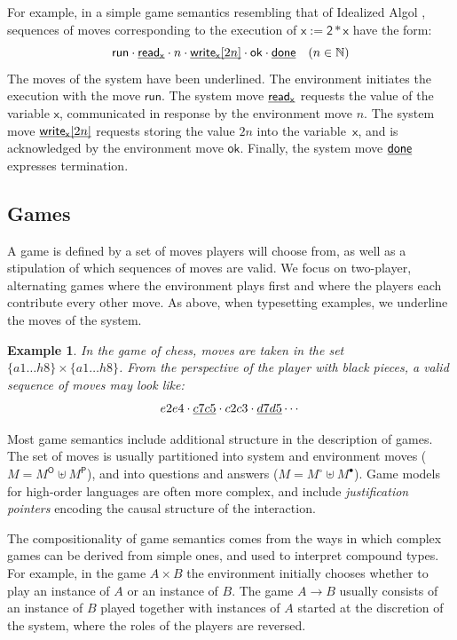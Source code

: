\documentclass[11pt,oneside,draft]{book}
\newtheorem{example}[theorem]{Example}
\theoremstyle{definition}
\newcommand{\kw}[1]{\ensuremath{ \mathsf{#1} }}
\newcommand{\que}{\circ}         %
\newcommand{\ans}{\bullet}       %
\newcommand{\ul}[1]{%
  \underline{\smash{#1}}
}
\begin{document}
For example,
in a simple game semantics resembling that of
Idealized Algol \citep{gsia},
sequences of moves corresponding to
the execution of $\kw{x := 2 * x}$
have the form:
\[
    \kw{run} \cdot
    \ul{\kw{read}_\kw{x}} \cdot n \cdot
    \ul{\kw{write}_\kw{x}[2n]} \cdot \kw{ok} \cdot
    \ul{\kw{done}} \quad (n \in \mathbb{N})
\]
The moves of the system have been underlined.
The environment initiates the execution with
the move $\kw{run}$.
The system move $\ul{\kw{read}_\kw{x}}$ requests
the value of the variable $\kw{x}$,
communicated in response by the environment move $n$.
The system move $\ul{\kw{write}_\kw{x}[2n]}$ requests
storing the value $2n$ into the variable~$\kw{x}$,
and is acknowledged by the environment move $\kw{ok}$.
Finally, the system move $\ul{\kw{done}}$
expresses termination.


\subsection{Games} \label{sec:mainideas:gs:games} %

A game is defined by a set of moves
players will choose from,
as well as a stipulation of which
sequences of moves are valid.
We focus on two-player, alternating games
where the environment plays first and
where the players
each contribute every other move.
As above, when typesetting examples,
we underline the moves of the system.

\begin{example}
In the game of chess,
moves are taken in the set $\{a1 \ldots h8\} \times \{a1 \ldots h8\}$.
From the perspective of the player
with black pieces,
a valid sequence of moves may look like:
\[ e2e4 \cdot \ul{c7c5} \cdot c2c3 \cdot \ul{d7d5} \cdots \]
\end{example}


Most game semantics
include additional structure
in the description of games.
The set of moves is usually partitioned
into system and environment moves ($M = M^\kw{O} \uplus M^\kw{P}$),
and into questions and answers ($M = M^\que \uplus M^\ans$).
Game models for high-order languages are often more complex,
and include \emph{justification pointers}
encoding the causal structure of the interaction.

The compositionality of game semantics
comes from the ways in which complex games can be derived from simple ones,
and used to interpret compound types.
For example,
in the game $A \times B$
the environment initially chooses whether to play
an instance of $A$ or an instance of $B$.
The game $A \rightarrow B$ usually consists of
an instance of $B$ played
together with instances of $A$
started at the discretion of the system,
where the roles of the players are reversed.
\end{document}
